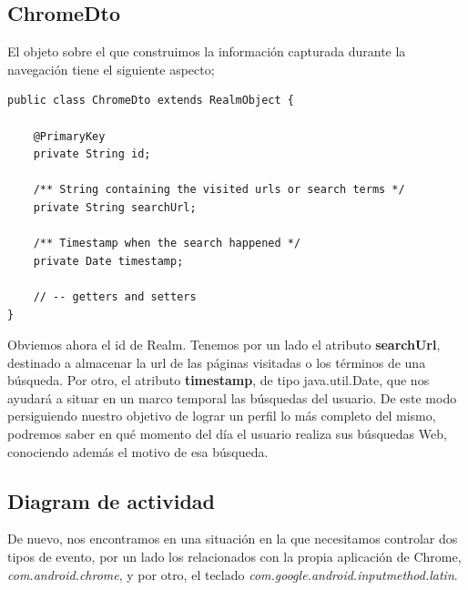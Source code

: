 \documentclass[12pt,a4paper,oneside]{book} %
\begin{document}
\subsection{ChromeDto}
El objeto sobre el que construimos la información capturada durante la navegación tiene el siguiente aspecto; 
\begin{verbatim}
public class ChromeDto extends RealmObject {

    @PrimaryKey
    private String id;

    /** String containing the visited urls or search terms */ 
    private String searchUrl;

    /** Timestamp when the search happened */ 
    private Date timestamp;
	
	// -- getters and setters 
}
\end{verbatim}
Obviemos ahora el id de Realm. Tenemos por un lado el atributo \textbf{searchUrl}, destinado a almacenar la url de las páginas visitadas o los términos de una búsqueda. 
\newline \newline 
Por otro, el atributo \textbf{timestamp}, de tipo java.util.Date, que nos ayudará a situar en un marco temporal las búsquedas del usuario. De este modo persiguiendo nuestro objetivo de lograr un perfil lo más completo del mismo, podremos saber en qué momento del día el usuario realiza sus búsquedas Web, conociendo además el motivo de esa búsqueda. 
\subsection{Diagram de actividad}
De nuevo, nos encontramos en una situación en la que necesitamos controlar dos tipos de evento, por un lado los relacionados con la propia aplicación de Chrome, \textit{com.android.chrome}, y por otro, el teclado \textit{com.google.android.inputmethod.latin}. 
\end{document}
